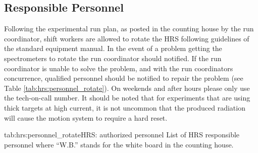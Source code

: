 \begin{safetyen}{0}{0}
\subsection{Responsible Personnel}

Following the experimental run plan, as posted in the counting house by the run coordinator,
shift workers are allowed to rotate the HRS following guidelines of the standard equipment manual.
In the event of a problem getting the spectrometers to rotate the run coordinator should notified.
If the run coordinator is unable to solve the problem, and with the run coordinators concurrence, 
qualified personnel should be notified to repair the problem (see Table \ref{tab:hrs:personnel_rotate}).  
On weekends and after hours please only use the tech-on-call number.
It should be noted that for experiments that are using thick targets at high current, it is
not uncommon that the produced radiation will cause the motion system to require a hard reset.

\begin{namestab}{tab:hrs:personnel_rotate}{HRS: authorized personnel}{%
      List of HRS responsible personnel where ``W.B.'' stands for the white board 
      in the counting house.}
   \JackSegal{}
   \HeidiFansler{}
   \JessieButler{}
   \AndrewLumanog{}
\end{namestab}

\end{safetyen}

